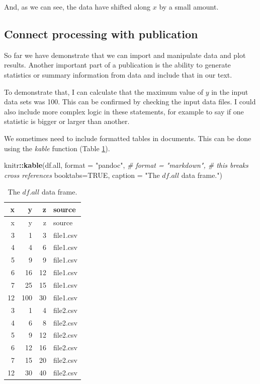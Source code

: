 \documentclass[11pt,]{article}
\newenvironment{Shaded}{\begin{snugshade}}{\end{snugshade}}
\newcommand{\CommentTok}[1]{\textcolor[rgb]{0.56,0.35,0.01}{\textit{#1}}}
\newcommand{\DataTypeTok}[1]{\textcolor[rgb]{0.13,0.29,0.53}{#1}}
\newcommand{\KeywordTok}[1]{\textcolor[rgb]{0.13,0.29,0.53}{\textbf{#1}}}
\newcommand{\NormalTok}[1]{#1}
\newcommand{\OperatorTok}[1]{\textcolor[rgb]{0.81,0.36,0.00}{\textbf{#1}}}
\newcommand{\OtherTok}[1]{\textcolor[rgb]{0.56,0.35,0.01}{#1}}
\newcommand{\StringTok}[1]{\textcolor[rgb]{0.31,0.60,0.02}{#1}}
\begin{document}
And, as we can see, the data have shifted along \(x\) by a small amount.

\hypertarget{connect-processing-with-publication}{%
\subsection{Connect processing with publication}\label{connect-processing-with-publication}}

So far we have demonstrate that we can import and manipulate data and plot results. Another important part of a publication is the ability to generate statistics or summary information from data and include that in our text.

To demonstrate that, I can calculate that the maximum value of \(y\) in the input data sets was 100. This can be confirmed by checking the input data files. I could also include more complex logic in these statements, for example to say if one statistic is bigger or larger than another.

We sometimes need to include formatted tables in documents. This can be done using the \emph{kable} function (Table \ref{tab:dfall}).

\begin{Shaded}
\begin{Highlighting}[]
\NormalTok{knitr}\OperatorTok{::}\KeywordTok{kable}\NormalTok{(df.all,}
             \DataTypeTok{format =} \StringTok{"pandoc"}\NormalTok{,}
             \CommentTok{# format = "markdown", # this breaks cross references}
             \DataTypeTok{booktabs=}\OtherTok{TRUE}\NormalTok{,}
             \DataTypeTok{caption =} \StringTok{"The $df.all$ data frame."}\NormalTok{)}
\end{Highlighting}
\end{Shaded}

\begin{longtable}[]{@{}rrrl@{}}
\caption{\label{tab:dfall}The \(df.all\) data frame.}\tabularnewline
\toprule
x & y & z & source\tabularnewline
\midrule
\endfirsthead
\toprule
x & y & z & source\tabularnewline
\midrule
\endhead
3 & 1 & 3 & file1.csv\tabularnewline
4 & 4 & 6 & file1.csv\tabularnewline
5 & 9 & 9 & file1.csv\tabularnewline
6 & 16 & 12 & file1.csv\tabularnewline
7 & 25 & 15 & file1.csv\tabularnewline
12 & 100 & 30 & file1.csv\tabularnewline
3 & 1 & 4 & file2.csv\tabularnewline
4 & 6 & 8 & file2.csv\tabularnewline
5 & 9 & 12 & file2.csv\tabularnewline
6 & 12 & 16 & file2.csv\tabularnewline
7 & 15 & 20 & file2.csv\tabularnewline
12 & 30 & 40 & file2.csv\tabularnewline
\bottomrule
\end{longtable}
\end{document}
